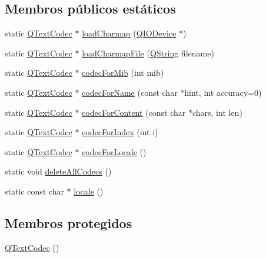 \subsection*{Membros públicos estáticos}
\begin{DoxyCompactItemize}
\item 
static \hyperlink{class_q_text_codec}{Q\-Text\-Codec} $\ast$ \hyperlink{class_q_text_codec_ae835f7063312ab94a973040c9ad588d0}{load\-Charmap} (\hyperlink{class_q_i_o_device}{Q\-I\-O\-Device} $\ast$)
\item 
static \hyperlink{class_q_text_codec}{Q\-Text\-Codec} $\ast$ \hyperlink{class_q_text_codec_a9d3248925f065ee5e78ae2f37fb8a1e0}{load\-Charmap\-File} (\hyperlink{class_q_string}{Q\-String} filename)
\item 
static \hyperlink{class_q_text_codec}{Q\-Text\-Codec} $\ast$ \hyperlink{class_q_text_codec_abfb0b216d80ea7ea3e8162e0a20d427c}{codec\-For\-Mib} (int mib)
\item 
static \hyperlink{class_q_text_codec}{Q\-Text\-Codec} $\ast$ \hyperlink{class_q_text_codec_a2a383609a67733ac9bbef18062f7c378}{codec\-For\-Name} (const char $\ast$hint, int accuracy=0)
\item 
static \hyperlink{class_q_text_codec}{Q\-Text\-Codec} $\ast$ \hyperlink{class_q_text_codec_a36ad11ff7f7a392535f41e9d20fd19c1}{codec\-For\-Content} (const char $\ast$chars, int len)
\item 
static \hyperlink{class_q_text_codec}{Q\-Text\-Codec} $\ast$ \hyperlink{class_q_text_codec_a6cb807c9a39a85fd6f691b8a418a1dd3}{codec\-For\-Index} (int i)
\item 
static \hyperlink{class_q_text_codec}{Q\-Text\-Codec} $\ast$ \hyperlink{class_q_text_codec_aa258f0ce93cb8ab1c0305dda367f945f}{codec\-For\-Locale} ()
\item 
static void \hyperlink{class_q_text_codec_a42ac9f1e7650a9778b846068133f3b79}{delete\-All\-Codecs} ()
\item 
static const char $\ast$ \hyperlink{class_q_text_codec_a8d36d74eeb8a213e911987a1a88c739a}{locale} ()
\end{DoxyCompactItemize}
\subsection*{Membros protegidos}
\begin{DoxyCompactItemize}
\item 
\hyperlink{class_q_text_codec_aadae8d06e1f93a0bbdb44cea03670273}{Q\-Text\-Codec} ()
\end{DoxyCompactItemize}
